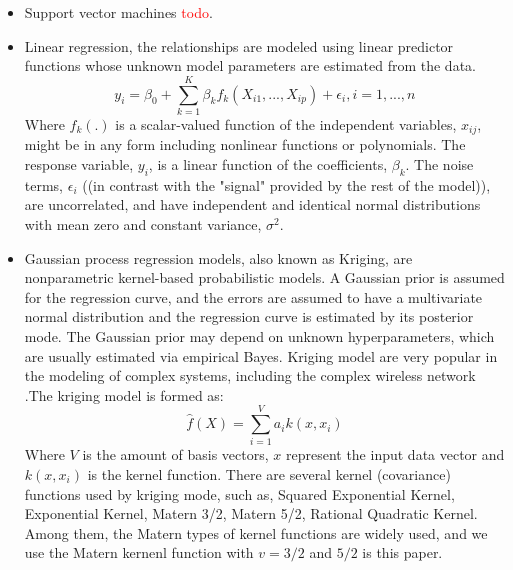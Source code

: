 \begin{itemize}
    \item Support vector machines \textcolor{red}{todo}.
    \item  Linear regression, the relationships are modeled using linear predictor functions whose unknown model parameters are estimated from the data. \\
\begin{equation}
y_i = \beta_0 + \sum_{k=1}^{K} \beta_k f_k (X_{i1}, ..., X_{ip}) + \epsilon_i, i = 1, ..., n
\end{equation}
Where $f_k (.)$ is a scalar-valued function of the independent variables, $x_{ij}$,  might be in any form including nonlinear functions or polynomials. The response variable, $y_i$, is a linear function of the coefficients, $\beta_k$. The  noise terms, $\epsilon_i$ ((in contrast with the "signal" provided by the rest of the model)), are uncorrelated, and have independent and identical normal distributions with mean zero and constant variance, $\sigma^2$.
    \item  Gaussian process regression  models, also known as Kriging, are nonparametric kernel-based probabilistic models. A Gaussian prior is assumed for the regression curve, and the errors are assumed to have a multivariate normal distribution and the regression curve is estimated by its posterior mode. The Gaussian prior may depend on unknown hyperparameters, which are usually estimated via empirical Bayes. 
Kriging model are very popular in the modeling of  complex systems, including the complex wireless network \cite{SUMOWirelessConferencing,wowmom2018, LTEoptimization}.The kriging model is formed as:
\begin{equation}
\hat{f} (X) = \sum_{i=1}^{V} {a_i}{k(x, x_i)}
\end{equation}
Where $V$ is the amount of basis vectors, $x$ represent the input data vector and $k(x, x_i)$ is the kernel function. There are several kernel (covariance) functions used by kriging mode, such as, Squared Exponential Kernel, Exponential Kernel, Matern 3/2, Matern 5/2, Rational Quadratic Kernel. Among them, the Matern types of kernel functions are  widely used, and we use the Matern kernenl function with $v=3/2$ and $5/2$ is this paper. 
\end{itemize}



